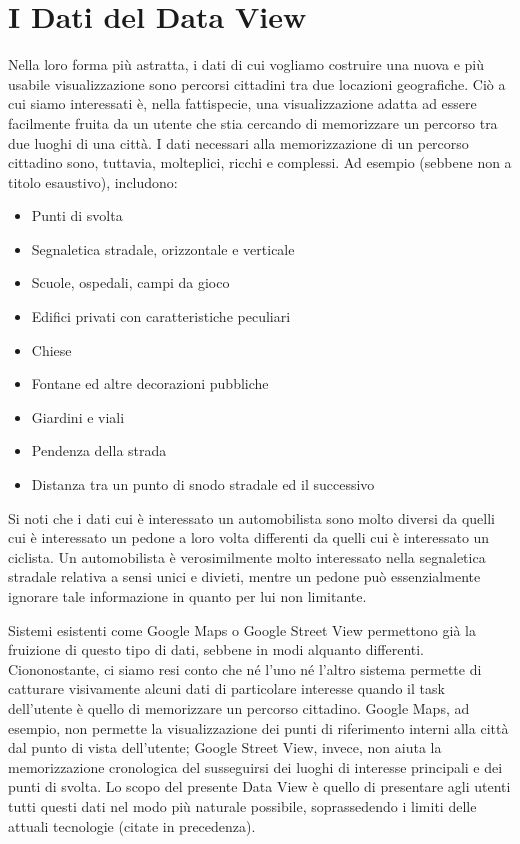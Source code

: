 \documentclass[12pt,a4paper,openright, notitlepage]{report}
\begin{document}
\section{I Dati del Data View}

Nella loro forma più astratta, i dati di cui vogliamo costruire una nuova e più usabile visualizzazione sono percorsi cittadini tra due locazioni geografiche. Ciò a cui siamo interessati è, nella fattispecie, una visualizzazione adatta ad essere facilmente fruita da un utente che stia cercando di memorizzare un percorso tra due luoghi di una città. I dati necessari alla memorizzazione di un percorso cittadino sono, tuttavia, molteplici, ricchi e complessi. Ad esempio (sebbene non a titolo esaustivo), includono:

\begin{itemize}
\item Punti di svolta
\item Segnaletica stradale, orizzontale e verticale
\item Scuole, ospedali, campi da gioco
\item Edifici privati con caratteristiche peculiari
\item Chiese
\item Fontane ed altre decorazioni pubbliche
\item Giardini e viali
\item Pendenza della strada
\item Distanza tra un punto di snodo stradale ed il successivo
\end{itemize}

Si noti che i dati cui è interessato un automobilista sono molto diversi da quelli cui è interessato un pedone a loro volta differenti da quelli cui è interessato un ciclista. Un automobilista è verosimilmente molto interessato nella segnaletica stradale relativa a sensi unici e divieti, mentre un pedone può essenzialmente ignorare tale informazione in quanto per lui non limitante.

Sistemi esistenti come Google Maps o Google Street View permettono già la fruizione di questo tipo di dati, sebbene in modi alquanto differenti. Ciononostante, ci siamo resi conto che né l’uno né l’altro sistema permette di catturare visivamente alcuni dati di particolare interesse quando il task dell’utente è quello di memorizzare un percorso cittadino. Google Maps, ad esempio, non permette la visualizzazione dei punti di riferimento interni alla città dal punto di vista dell’utente; Google Street View, invece, non aiuta la memorizzazione cronologica del susseguirsi dei luoghi di interesse principali e dei punti di svolta. Lo scopo del presente Data View è quello di presentare agli utenti tutti questi dati nel modo più naturale possibile, soprassedendo i limiti delle attuali tecnologie (citate in precedenza).
\end{document}
